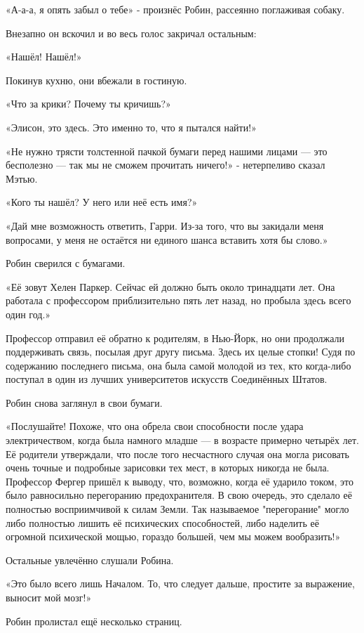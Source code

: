 \documentclass[a5paper, 9pt,
final, openany, twoside=true]{memoir}
\begin{document}
«А-а-а, я опять забыл о тебе» - произнёс Робин, рассеянно поглаживая собаку.

Внезапно он вскочил и во весь голос закричал остальным:

«Нашёл! Нашёл!»

Покинув кухню, они вбежали в гостиную.

«Что за крики? Почему ты кричишь?»

«Элисон, это здесь. Это именно то, что я пытался найти!»

«Не нужно трясти толстенной пачкой бумаги перед нашими лицами — это бесполезно — так мы не сможем прочитать ничего!» - нетерпеливо сказал Мэтью.

«Кого ты нашёл? У него или неё есть имя?»

«Дай мне возможность ответить, Гарри. Из-за того, что вы закидали меня вопросами, у меня не остаётся ни единого шанса вставить хотя бы слово.»

Робин сверился с бумагами.

«Её зовут Хелен Паркер. Сейчас ей должно быть около тринадцати лет. Она работала с профессором приблизительно пять лет назад, но пробыла здесь всего один год.»

Профессор отправил её обратно к родителям, в Нью-Йорк, но они продолжали поддерживать связь, посылая друг другу письма. Здесь их целые стопки! Судя по содержанию последнего письма, она была самой молодой из тех, кто когда-либо поступал в один из лучших университетов искусств Соединённых Штатов.

Робин снова заглянул в свои бумаги.

«Послушайте! Похоже, что она обрела свои способности после удара электричеством, когда была намного младше — в возрасте примерно четырёх лет. Её родители утверждали, что после того несчастного случая она могла рисовать очень точные и подробные зарисовки тех мест, в которых никогда не была. Профессор Фергер пришёл к выводу, что, возможно, когда её ударило током, это было равносильно перегоранию предохранителя. В свою очередь, это сделало её полностью восприимчивой к силам Земли. Так называемое "перегорание" могло либо полностью лишить её психических способностей, либо наделить её огромной психической мощью, гораздо большей, чем мы можем вообразить!»

Остальные увлечённо слушали Робина.

«Это было всего лишь Началом. То, что следует дальше, простите за выражение, выносит мой мозг!»

Робин пролистал ещё несколько страниц.
\end{document}

